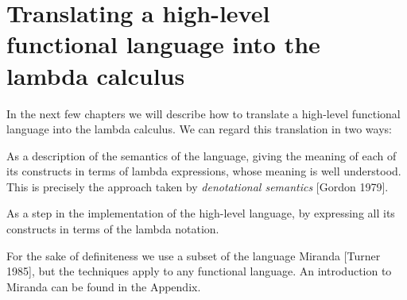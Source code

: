 \chapter[Translating a high-level functional language into the lambda calculus][Translating a high-level functional language into the lambda calculus]{Translating a high-level\\ functional language into the\\ lambda calculus}

In the next few chapters we will describe how to translate a high-level functional language into the lambda calculus. We can regard this translation in two ways:

\begin{numbered}
    \item As a description of the semantics of the language, giving the meaning of each of its constructs in terms of lambda expressions, whose meaning is well understood. This is precisely the approach taken by \textit{denotational semantics} [Gordon 1979].
    \item As a step in the implementation of the high-level language, by expressing all its constructs in terms of the lambda notation.
\end{numbered}

For the sake of definiteness we use a subset of the language Miranda [Turner 1985], but the techniques apply to any functional language. An introduction to Miranda can be found in the Appendix.
\vfill


